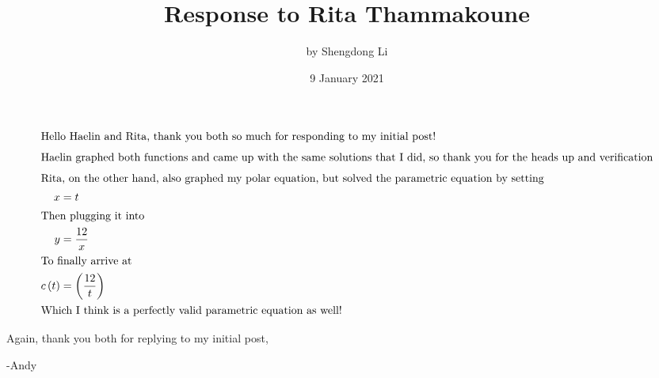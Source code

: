 \documentclass[12pt]{article}
\begin{document}
\title{Response to Rita Thammakoune}
\author{by Shengdong Li}
\date{9 January 2021}
\maketitle

\begin{align*}
\intertext{Hello Haelin and Rita, thank you both so much for responding to my initial post!}
\intertext{Haelin graphed both functions and came up with the same solutions that I did, so thank you for the heads up and verification}
\intertext{Rita, on the other hand, also graphed my polar equation, but solved the parametric equation by setting}
x&=t\\
\intertext{Then plugging it into}
y&=\frac{12}{x}\\
\intertext{To finally arrive at}
c\left(t\right)&=\left(\frac{12}{t}\right)\\
\intertext{Which I think is a perfectly valid parametric equation as well!}
\end{align*}

Again, thank you both for replying to my initial post,

\bigskip

-Andy
\end{document}
